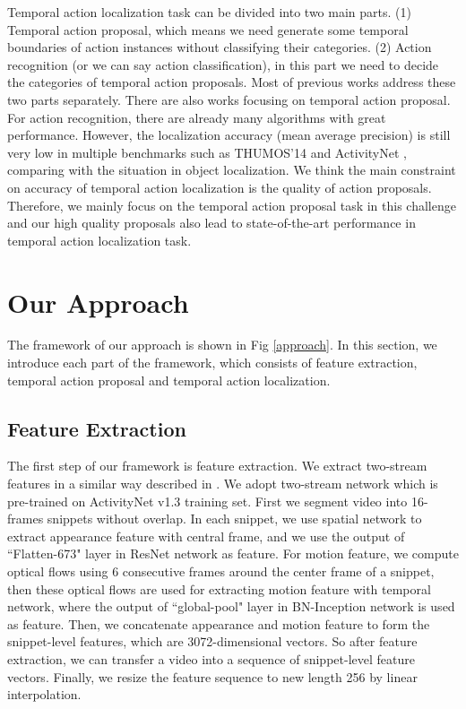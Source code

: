 \documentclass[10pt,twocolumn,letterpaper]{article}
\begin{document}
Temporal action localization task can be divided into two main parts. (1) Temporal action proposal, which means we need generate some temporal boundaries of action instances without classifying their categories. (2) Action recognition (or we can say action classification), in this part we need to decide the categories of temporal action proposals. Most of previous works \cite{shou2016action,xiong2017pursuit} address these two parts separately.  There are also works \cite{escorcia2016daps,fast_temporal_activity_cvpr16} focusing on temporal action proposal.   For action recognition, there are already many algorithms \cite{wang2016temporal,feichtenhofer2016convolutional} with great performance. However, the localization accuracy (mean average precision) is still very low in multiple benchmarks such as THUMOS'14 \cite{jiang2014thumos} and ActivityNet \cite{caba2015activitynet}, comparing with the situation in object localization. We think the main constraint on accuracy of temporal action localization  is the quality of action proposals. Therefore, we mainly focus on the temporal action proposal task in this challenge and our high quality proposals also lead to state-of-the-art performance in temporal action localization task.




\section{Our Approach}

The framework of our approach is shown in Fig \ref{approach}. In this section, we  introduce each part of the framework, which consists of feature extraction, temporal action proposal and temporal action localization.


\subsection{Feature Extraction}

The first step of our framework is feature extraction. We extract two-stream features in a similar way described in \cite{gao2017cascaded}. We adopt two-stream network \cite{xiong2016cuhk} which is pre-trained on ActivityNet v1.3 training set. First we segment video  into 16-frames snippets without overlap. In each snippet, we use spatial network to extract appearance feature with central frame, and we use the output of ``Flatten-673" layer in ResNet network as feature. For motion feature, we compute optical flows using 6 consecutive frames around the center frame of a snippet, then these optical flows are used for extracting motion feature with temporal network, where the output of ``global-pool" layer in BN-Inception network is used as feature. Then, we concatenate appearance and motion feature to form the snippet-level features, which are 3072-dimensional vectors. So after feature extraction, we can transfer a video into a sequence of snippet-level feature vectors. Finally, we resize the feature sequence to new length 256 by linear interpolation.
\end{document}
